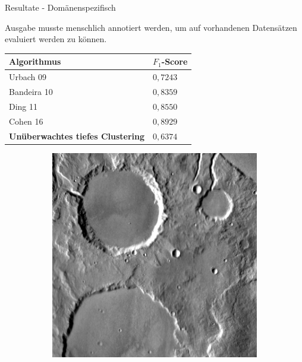 \documentclass{beamer}
\begin{document}
\begin{frame}[allowframebreaks]{Resultate - Domänenspezifisch}
\begin{figure}[h!]
\begin{subfigure}{0.38\textwidth}
		\end{subfigure}
	\end{figure}
	\newpage
	Ausgabe musste menschlich annotiert werden, um auf vorhandenen Datensätzen evaluiert werden zu können.\\\vspace{10pt}
	\begin{minipage}{0.58\textwidth}
		\footnotesize
		\begin{table}[h!]
			\begin{tabularx}{\textwidth}{p{} >{\centering\arraybackslash}p{}}
				\toprule
				\textbf{Algorithmus} & \textbf{$F_1$-Score\footnotemark} \\
				\midrule
				Urbach 09 \cite{urbach_stepinski_2009} & $0,7243$ \\
				Bandeira 10 \cite{bandeira_10} & $0,8359$ \\
				Ding 11 \cite{ding_11} & $0,8550$ \\
				Cohen 16 \cite{cohen_16} \footnotemark[3] & $0,8929$ \\
				\textbf{Unüberwachtes tiefes Clustering} & $0,6374$\\
				\bottomrule
			\end{tabularx}
		\end{table}
	\end{minipage}
	\hfill
	\begin{minipage}{0.38\textwidth}
		\begin{figure}[h!]
			\begin{subfigure}[t]{0.31\textwidth}
				\includegraphics[width=\linewidth,keepaspectratio]{gfx/rob_in/thm_dir_N-30_210.png_sourcetile_60.png}

\end{subfigure}
\end{figure}
\end{minipage}
\end{frame}
\end{document}
